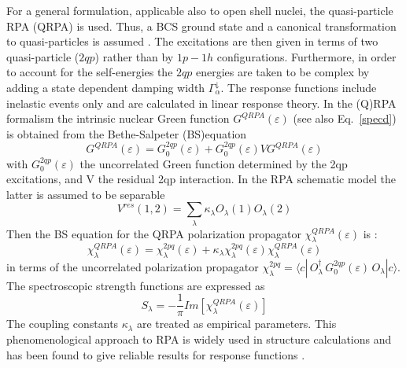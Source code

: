\documentclass[twocolumn,amsmath,amssymb,10pt,groupedaddress,a4paper]{revtex4}
\begin{document}
For a general formulation, applicable also to open shell nuclei, the
quasi-particle RPA (QRPA) is used. Thus, a BCS ground
state and a canonical transformation to quasi-particles is assumed
\cite{RS}. The excitations are then given in terms of two quasi-particle
($2qp$) rather than by $1p-1h$ configurations. Furthermore, in order
to account for the self-energies the $2qp$ energies are taken to
be complex by adding a state dependent damping width $\Gamma_{\alpha}^{\downarrow}$.
The response functions include inelastic events only and are calculated
in linear response theory.
In the (Q)RPA formalism the intrinsic nuclear Green function $G^{QRPA}(\varepsilon)$ (see also Eq.~\ref{specd}) is obtained from the Bethe-Salpeter (BS)equation \cite{fetter}
\begin{equation}
G^{QRPA}(\varepsilon) = G_{0}^{2qp}(\varepsilon)+ G_{0}^{2qp}(\varepsilon)VG^{QRPA}(\varepsilon)\label{bs1}\end{equation}
with  $G_{0}^{2qp}(\varepsilon)$ the uncorrelated Green function determined by the 2qp excitations, and V the residual 2qp interaction. In the RPA schematic model the latter is assumed to be
separable \begin{equation}
V^{res}(1,2)=\sum_{\lambda}\kappa _{\lambda}O_{\lambda}(1)O_{\lambda}(2)
\end{equation}
Then the BS equation for the QRPA polarization propagator $\chi_{\lambda}^{QRPA}(\varepsilon)$
is \cite{TULnew}:
\begin{equation}
\chi_{\lambda}^{QRPA}(\varepsilon)=  \chi_{\lambda}^{2pq}(\varepsilon) + \kappa_{\lambda}\chi_{\lambda}^{2pq}(\varepsilon)\chi_{\lambda}^{QRPA}(\varepsilon)\label{bs2}
\end{equation}
in terms of the uncorrelated polarization propagator
$\chi_{\lambda}^{2pq} = \langle c|\,O_{\lambda}^{\dagger
}\,G_{0}^{2qp}(\varepsilon )\,O_{\lambda}|c\rangle$.
The spectroscopic strength functions are expressed as \begin{equation}
S_{\lambda} =-\frac{1}{\pi}Im[\chi_{\lambda}^{QRPA}(\varepsilon)]
\label{sprpa}
\end{equation}
The coupling constants $\kappa_{\lambda}$
are treated as empirical parameters. This phenomenological approach
to RPA is widely used in structure calculations and has
been found to give reliable results for response functions \cite{BM,Solv}.
\end{document}
